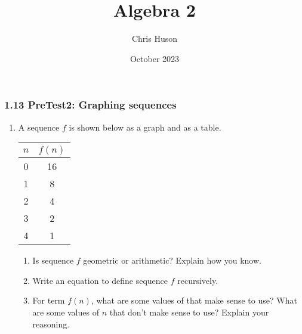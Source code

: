 \documentclass[12pt, twoside]{article}
\title{Algebra 2}
\author{Chris Huson}
\date{October 2023}
\begin{document}
\subsubsection*{1.13 PreTest2: Graphing sequences}
\begin{enumerate}

\item A sequence $f$ is shown below as a graph and as a table.
\begin{multicols}{2}
    
\begin{center}
    \end{center}
    \begin{tabular}{c|c}
        $n$ & $f(n)$ \\ \hline
        0 & 16 \\ 
        1 & 8 \\ 
        2 & 4 \\ 
        3 & 2 \\ 
        4 & 1 \\ 
        \end{tabular}
    \end{multicols}
    \begin{enumerate}
        \item Is sequence $f$ geometric or arithmetic? Explain how you know. \vspace{2cm}
        \item Write an equation to define sequence $f$ recursively. \vspace{3cm}
        \item For term $f(n)$, what are some values of that make sense to use? What are some values of $n$ that don't make sense to use? Explain your reasoning.
    \end{enumerate}


\end{enumerate}
\end{document}
